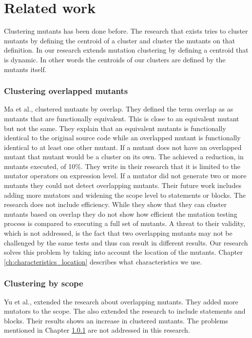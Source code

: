 \documentclass[../main]{subfiles}
\begin{document}
\chapter{Related work}
\label{ch:related_work}
Clustering mutants has been done before.
The research that exists tries to cluster mutants by defining the centroid of a cluster and cluster the mutants on that definition.
In our research extends mutation clustering by defining a centroid that is dynamic.
In other words the centroids of our clusters are defined by the mutants itself.

\subsection{Clustering overlapped mutants}
\label{ch:overlapping_mutants}
Ma et al., clustered mutants by overlap\cite{Ma2016}.
They defined the term overlap as as mutants that are functionally equivalent.
This is close to an equivalent mutant but not the same.
They explain that an equivalent mutants is functionally identical to the original source code while an overlapped mutant is functionally identical to at least one other mutant.
If a mutant does not have an overlapped mutant that mutant would be a cluster on its own.
The achieved a reduction, in mutants executed, of 10\%.
They write in their research that it is limited to the mutator operators on expression level. 
If a mutator did not generate two or more mutants they could not detect overlapping mutants.
Their future work includes adding more mutators and widening the scope level to statements or blocks.
\newline
The research does not include efficiency.
While they show that they can cluster mutants based on overlap they do not show how efficient the mutation testing process is compared to executing a full set of mutants.
A threat to their validity, which is not addressed, is the fact that two overlapping mutants may not be challenged by the same tests and thus can result in different results.
Our research solves this problem by taking into account the location of the mutants.
Chapter \ref{ch:characteristics_location} describes what characteristics we use.

\subsection{Clustering by scope}
Yu et al., extended the research about overlapping mutants\cite{Yu2019PossibilityScope}.
They added more mutators to the scope.
The also extended the research to include statements and blocks.
Their results shows an increase in clustered mutants.
The problems mentioned in Chapter \ref{ch:overlapping_mutants} are not addressed in this research.
\end{document}
